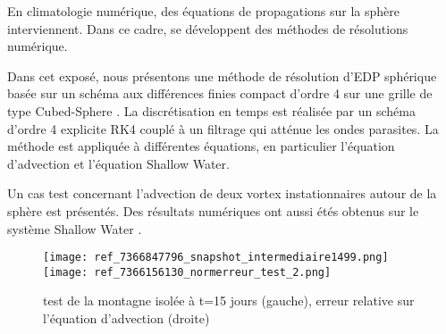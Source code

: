 \documentclass[10pt]{article}
\begin{document}
En climatologie num\'erique, des \'equations de propagations sur la sph\`ere interviennent. Dans ce cadre, se d\'eveloppent des m\'ethodes de r\'esolutions num\'erique. 

Dans cet expos\'e, nous pr\'esentons une méthode de r\'esolution d'EDP sph\'erique bas\'ee sur un sch\'ema aux diff\'erences finies compact d'ordre 4 \cite{Lele1991} sur une grille de type Cubed-Sphere \cite{Ronchi1996}. La discr\'etisation en temps est r\'ealis\'ee par un sch\'ema d'ordre 4 explicite RK4 coupl\'e \`a un filtrage qui att\'enue les ondes parasites. La m\'ethode est appliqu\'ee à diff\'erentes \'equations, en particulier l'\'equation d'advection et l'\'equation Shallow Water.

Un cas test concernant l'advection de deux vortex instationnaires autour de la sph\`ere \cite{Nair2008} est pr\'esent\'es. Des r\'esultats num\'eriques ont aussi étés obtenus sur le syst\`eme Shallow Water \cite{Williamson1992}.

\begin{figure}[ht]
\begin{center}
\texttt{[image: ref\_7366847796\_snapshot\_intermediaire1499.png]}
\texttt{[image: ref\_7366156130\_normerreur\_test\_2.png]}
\end{center}
\caption{test de la montagne isolée \cite{Williamson1992} à t=15 jours (gauche), erreur relative sur l'équation d'advection \cite{Nair2008} (droite)}
\end{figure}
\end{document}

